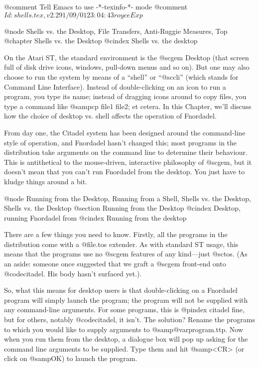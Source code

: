 @comment Tell Emacs to use -*-texinfo-*- mode
@comment $Id: shells.tex,v 2.2 91/09/01 23:04:43 royce Exp $

@node Shells vs. the Desktop, File Transfers, Anti-Ruggie Measures, Top
@chapter Shells vs. the Desktop
@cindex Shells vs. the desktop

On the Atari ST, the standard environment is the @sc{gem} Desktop (that
screen full of disk drive icons, windows, pull-down menus and so on).  But
one may also choose to run the system by means of a ``shell'' or ``@sc{cli}''
(which stands for Command Line Interface).  Instead of double-clicking on
an icon to run a program, you type its name; instead of dragging icons
around to copy files, you type a command like @samp{cp file1 file2}; et cetera.
In this Chapter, we'll discuss how the choice of desktop vs. shell affects
the operation of Fnordadel.

From day one, the Citadel system has been designed around the
command-line style of operation, and Fnordadel hasn't changed this;
most programs in the distribution take arguments on the command line to
determine their behaviour.  This is antithetical to the mouse-driven,
interactive philosophy of @sc{gem}, but it doesn't mean that you can't run
Fnordadel from the desktop.  You just have to kludge things around a
bit.

@node Running from the Desktop, Running from a Shell, Shells vs. the Desktop, Shells vs. the Desktop
@section Running from the Desktop
@cindex Desktop, running Fnordadel from
@cindex Running from the desktop

There are a few things you need to know.  Firstly, all the
programs in the distribution come with a @file{.tos} extender.  As with standard
ST usage, this means that the programs use no @sc{gem} features of any
kind---just @sc{tos}.  (As an aside: someone once suggested that we graft a
@sc{gem} front-end onto @code{citadel}.  His body hasn't surfaced yet.).

So, what this means for desktop users is that double-clicking on a
Fnordadel program will simply launch the program; the program will not
be supplied with any command-line arguments.  For some programs, this is
@pindex citadel
fine, but for others, notably @code{citadel}, it isn't.  The solution?
Rename the programs to which you would like to supply arguments to
@samp{@var{program}.ttp}.  Now when you run them from the desktop,
a dialogue box will
pop up asking for the command line arguments to be supplied.  Type them
and hit @samp{<CR>} (or click on @samp{OK}) to launch the program.

